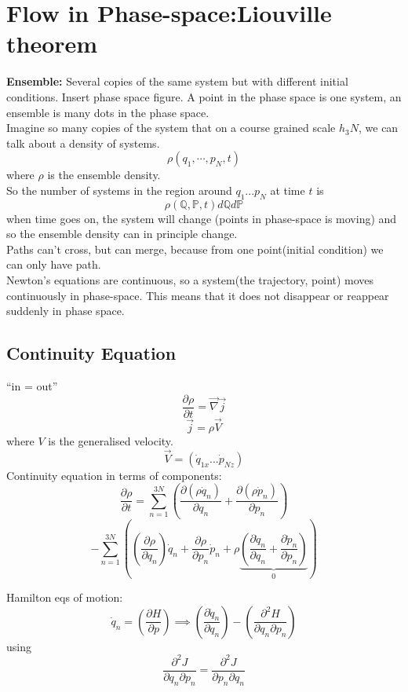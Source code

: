 \documentclass[11pt]{book}
\theoremstyle{definition}
\begin{document}
\section{Flow in Phase-space:Liouville theorem}
\textbf{Ensemble:} Several copies of the same system but with different initial conditions.
Insert phase space figure.
A point in the phase space is one system, an ensemble is many dots in the phase space. \\
Imagine so many copies of the system that on a course grained scale $ h_3N $, we can talk about a density of systems.
\[ \rho(q_1, \cdots, p_N, t) \] 
where $ \rho $ is the ensemble density. \\
So the number of systems in the region around $ q_1 ... p_N $  at time $ t $ is 
\[ \rho(\mathbb{Q}, \mathbb{P}, t) d\mathbb{Q} d\mathbb{P} \] 
when time goes on, the system will change (points in phase-space is moving) and so the ensemble density can in principle change. \\
Paths can't cross, but can merge, because from one point(initial condition) we can only have path. \\
Newton's equations are continuous, so a system(the trajectory, point) moves continuously in phase-space. This means that it does not disappear or reappear suddenly in phase space.
\subsection{Continuity Equation}
``in = out''
\[ \frac{\partial \rho}{\partial t}  = \vec{\nabla} \vec{j}  \] 
\[ \vec{j} = \rho \vec{V} \] where $ V $ is the generalised velocity. 
\[ \vec{V} = \left( \dot q_{1x} ... \dot p_{Nz} \right)  \] 
Continuity equation in terms of components:
\[ \frac{\partial \rho}{\partial t}  = \sum_{n=1}^{3N} \left( \frac{\partial (\rho \dot q_n)}{\partial q_n} + \frac{\partial (\rho \dot p_n)}{\partial p_n}  \right) \] 
\[ - \sum_{n=1}^{3N} \left( \left( \frac{\partial \rho}{\partial  q_n} \right) \dot q_n  + \frac{\partial \rho}{\partial p_n} \dot p_n + \rho \underbrace{\left( \frac{\partial \dot q_n}{\partial q_n} + \frac{\partial \dot p_n}{\partial p_n}  \right)}_{0} \right)  \] 

Hamilton eqs of motion:
\[ \dot q_n = \left( \frac{\partial H}{\partial p} \right) \implies \left( \frac{\partial \dot q_n}{\partial q_n} \right) -  \left( \frac{\partial^2 H}{\partial q_n \partial p_n} \right) \] 
using \[ \frac{\partial ^2J}{\partial q_n \partial p_n}  =  \frac{\partial ^2J}{\partial p_n \partial q_n} \] 
\end{document}
